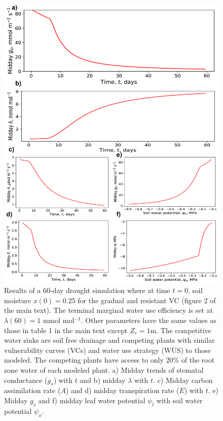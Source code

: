 \documentclass[utf8]{frontiers_suppmat} %
\begin{document}
\begin{figure}[b]
    \centering
    \includegraphics[scale=0.15]{Long_Drought_Fig.jpg}
    \caption{Results of a 60-day drought simulation where at time $t=0$, soil moisture $x(0) =0.25$ for the gradual and resistant VC (figure 2 of the main text). The terminal marginal water use efficiency is set at $\lambda(60) = 1$ mmol mol$^{-1}$. Other parameters have the same values as those in table 1 in the main text except $Z_r = 1$m. The competitive water sinks are soil free drainage and competing plants with similar vulnerability curves (VCs) and water use strategy (WUS) to those modeled. The competing plants have access to only 20\% of the root zone water of each modeled plant. a) Midday trends of stomatal conductance ($g_s$) with $t$ and b) midday $\lambda$ with $t$. c) Midday carbon assimilation rate ($A$) and d) midday transpiration rate ($E$) with $t$. e) Midday $g_s$ and f) midday leaf water potential $\psi_l$ with soil water potential $\psi_x$.}
    \label{fig:Drought}
\end{figure}
\end{document}
